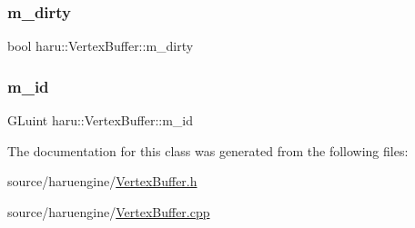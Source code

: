 \mbox{\label{classharu_1_1_vertex_buffer_a42cc7fd939921990cad71e1e3856725c}} 
\subsubsection{\texorpdfstring{m\+\_\+dirty}{m\_dirty}}
{\footnotesize\ttfamily bool haru\+::\+Vertex\+Buffer\+::m\+\_\+dirty\hspace{0.3cm}{\ttfamily [private]}}

\mbox{\label{classharu_1_1_vertex_buffer_a63aad09771ce7a6722d56e56c0e09922}} 
\subsubsection{\texorpdfstring{m\+\_\+id}{m\_id}}
{\footnotesize\ttfamily G\+Luint haru\+::\+Vertex\+Buffer\+::m\+\_\+id\hspace{0.3cm}{\ttfamily [private]}}



The documentation for this class was generated from the following files\+:\begin{DoxyCompactItemize}
\item 
source/haruengine/\mbox{\hyperlink{_vertex_buffer_8h}{Vertex\+Buffer.\+h}}\item 
source/haruengine/\mbox{\hyperlink{_vertex_buffer_8cpp}{Vertex\+Buffer.\+cpp}}\end{DoxyCompactItemize}
